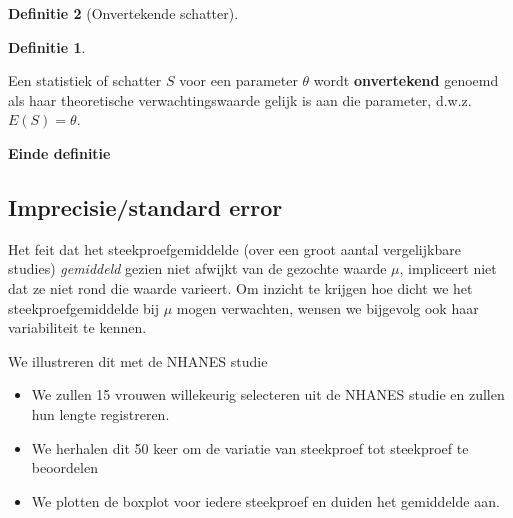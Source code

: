 \documentclass[
  12pt,dutch,coursenotes]{book}
\providecommand{\tightlist}{%
  \setlength{\itemsep}{0pt}\setlength{\parskip}{0pt}}
\theoremstyle{definition}
\newtheorem{definition}{Definitie}[chapter]
\theoremstyle{definition}
\theoremstyle{definition}
\theoremstyle{remark}
\begin{document}
\begin{definition}[Onvertekende schatter]
\begin{definition}

\protect\hypertarget{def:unnamed-chunk-128}{}{\label{def:unnamed-chunk-128} \iffalse (Onvertekende schatter) \fi{} }

\end{definition}
\end{definition}

Een statistiek of schatter \(S\) voor een
parameter \(\theta\) wordt \textbf{onvertekend} genoemd als haar theoretische
verwachtingswaarde gelijk is aan die parameter, d.w.z. \(E(S)= \theta\).

\textbf{Einde definitie}

\hypertarget{imprecisiestandard-error}{%
\subsection{Imprecisie/standard error}\label{imprecisiestandard-error}}

Het feit dat het steekproefgemiddelde (over een groot aantal vergelijkbare studies) \emph{gemiddeld} gezien niet afwijkt van de gezochte waarde \(\mu\), impliceert niet dat ze niet rond die waarde varieert.
Om inzicht te krijgen hoe dicht we het steekproefgemiddelde bij \(\mu\) mogen verwachten, wensen we bijgevolg ook haar variabiliteit te kennen.

We illustreren dit met de NHANES studie

\begin{itemize}
\tightlist
\item
  We zullen 15 vrouwen willekeurig selecteren uit de NHANES studie en zullen hun lengte registreren.
\item
  We herhalen dit 50 keer om de variatie van steekproef tot steekproef te beoordelen
\item
  We plotten de boxplot voor iedere steekproef en duiden het gemiddelde aan.
\end{itemize}
\end{document}
